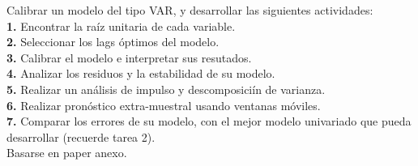 \begin{mdframed}[style=MyFrame]
	Calibrar un modelo del tipo VAR, y desarrollar las siguientes actividades:\\
		\textbf{1.} Encontrar la ra\'{i}z unitaria de cada variable.\\
		\textbf{2.} Seleccionar los lags \'optimos del modelo.\\
		\textbf{3.} Calibrar el modelo e interpretar sus resutados.\\
		\textbf{4.} Analizar los residuos y la estabilidad de su modelo.\\
		\textbf{5.} Realizar un análisis de impulso y descomposici\'{i}n de varianza.\\
		\textbf{6.} Realizar pron\'ostico extra-muestral usando ventanas m\'oviles.\\
		\textbf{7.} Comparar los errores de su modelo, con el mejor modelo univariado que pueda desarrollar (recuerde tarea 2).\\
	\vspace{4mm}	
	Basarse en paper anexo.
\end{mdframed}

